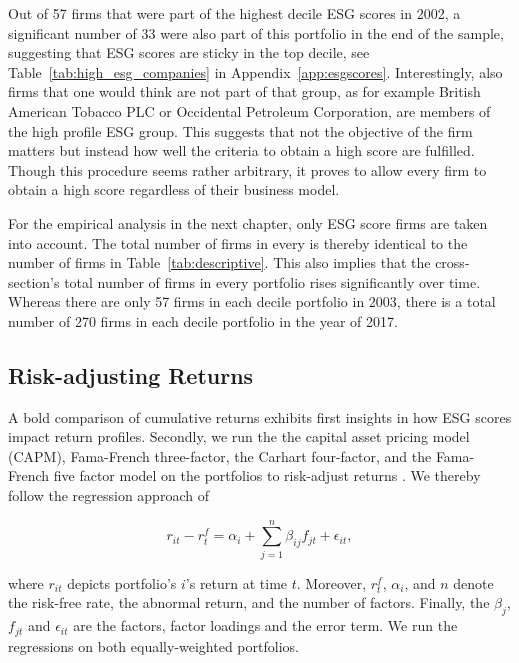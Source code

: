 \documentclass[11pt]{article}
\begin{document}
Out of 57 firms that were part of the highest decile ESG scores in 2002, a significant number of 33 were also part of this portfolio in the end of the sample, suggesting that ESG scores are sticky in the top decile, see Table~\ref{tab:high_esg_companies} in Appendix~\ref{app:esgscores}. Interestingly, also firms that one would think are not part of that group, as for example British American Tobacco PLC or Occidental Petroleum Corporation, are members of the high profile ESG group. This suggests that not the objective of the firm matters but instead how well the criteria to obtain a high score are fulfilled. Though this procedure seems rather arbitrary, it proves to allow every firm to obtain a high score regardless of their business model.

For the empirical analysis in the next chapter, only ESG score firms are taken into account. The total number of firms in every is thereby identical to the number of firms in Table~\ref{tab:descriptive}. This also implies that the cross-section's total number of firms in every portfolio rises significantly over time. Whereas there are only 57 firms in each decile portfolio in 2003, there is a total number of 270 firms in each decile portfolio in the year of 2017.


\subsection{Risk-adjusting Returns}

A bold comparison of cumulative returns exhibits first insights in how ESG scores impact return profiles. Secondly, we run the the capital asset pricing model (CAPM), Fama-French three-factor, the Carhart four-factor, and the Fama-French five factor model on the portfolios to risk-adjust returns \citep[see][]{Sharpe1964,Fama1992,Carhart1997,Fama2015}. We thereby follow the regression approach of


\begin{equation}
\label{eq:riskadjustment}
r_{it} - r_t^f = \alpha_i + \sum_{j=1}^{n} \beta_{ij} f_{jt} + \epsilon_{it},
\end{equation}

where $r_{it}$ depicts portfolio's $i$'s return at time $t$. Moreover, $r_t^f$, $\alpha_i$, and $n$ denote the risk-free rate, the abnormal return, and the number of factors. Finally, the $\beta_{j}$, $f_{jt}$ and $\epsilon_{it}$ are the factors, factor loadings and the error term. We run the regressions on both equally-weighted portfolios.
\end{document}
